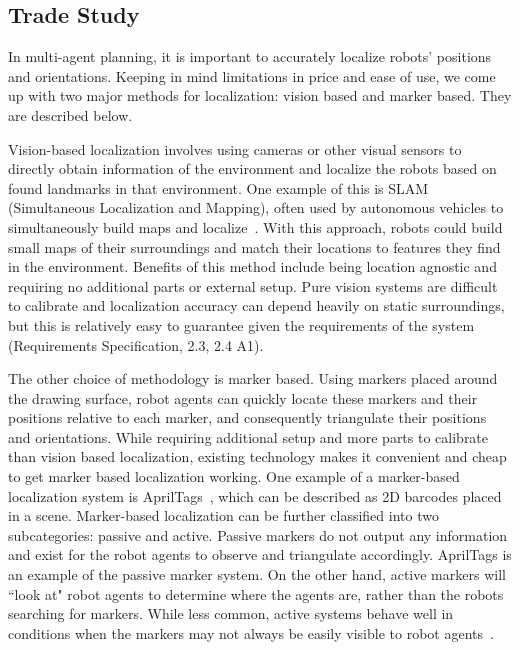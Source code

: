 \subsection{Trade Study}
\label{sec:trade_localization}
In multi-agent planning, it is important to accurately localize robots' positions and orientations. Keeping in mind limitations in price and ease of use, we come up with two major methods for localization: vision based and marker based. They are described below.

Vision-based localization involves using cameras or other visual sensors to directly obtain information of the environment and localize the robots based on found landmarks in that environment. One example of this is SLAM (Simultaneous Localization and Mapping), often used by autonomous vehicles to simultaneously build maps and localize~\cite{dissanayake2001solution}. With this approach, robots could build small maps of their surroundings and match their locations to features they find in the environment. Benefits of this method include being location agnostic and requiring no additional parts or external setup. Pure vision systems are difficult to calibrate and localization accuracy can depend heavily on static surroundings, but this is relatively easy to guarantee given the requirements of the system (Requirements Specification, 2.3, 2.4 A1).

The other choice of methodology is marker based. Using markers placed around the drawing surface, robot agents can quickly locate these markers and their positions relative to each marker, and consequently triangulate their positions and orientations. While requiring additional setup and more parts to calibrate than vision based localization, existing technology makes it convenient and cheap to get marker based localization working. One example of a marker-based localization system is AprilTags~\cite{olson2011apriltag}, which can be described as 2D barcodes placed in a scene. Marker-based localization can be further classified into two subcategories: passive and active. Passive markers do not output any information and exist for the robot agents to observe and triangulate accordingly. AprilTags is an example of the passive marker system. On the other hand, active markers will ``look at" robot agents to determine where the agents are, rather than the robots searching for markers. While less common, active systems behave well in conditions when the markers may not always be easily visible to robot agents~\cite{cassinis2005active}.

